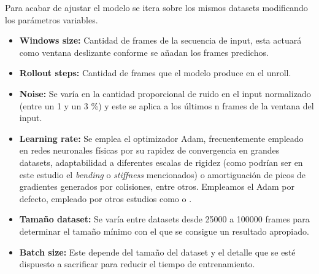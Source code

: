 Para acabar de ajustar el modelo se itera sobre los mismos datasets modificando los parámetros variables.
\begin{itemize}
    \item \textbf{Windows size:} Cantidad de frames de la secuencia de input, esta actuará como ventana deslizante conforme se añadan los frames predichos.
    \item \textbf{Rollout steps:} Cantidad de frames que el modelo produce en el unroll.
    \item \textbf{Noise:} Se varía en la cantidad proporcional de ruido en el input normalizado (entre un 1 y un 3 \%) y este se aplica a los últimos n frames de la ventana del input.
    \item \textbf{Learning rate:} Se emplea el optimizador Adam, frecuentemente empleado en redes neuronales físicas por su rapidez de convergencia en grandes datasets, adaptabilidad a diferentes escalas de rigidez (como podrían ser en este estudio el \textit{bending} o \textit{stiffness} mencionados) o  amortiguación de picos de gradientes generados por colisiones, entre otros. Empleamos el Adam por defecto, empleado por otros estudios como \cite{bertiche2021PBNS} o \cite{chentanez_cloth_2020}. 
    \item \textbf{Tamaño dataset:} Se varía entre datasets desde 25000 a 100000 frames para determinar el tamaño mínimo con el que se consigue un resultado apropiado.
    \item \textbf{Batch size:} Este depende del tamaño del dataset y el detalle que se esté dispuesto a sacrificar para reducir el tiempo de entrenamiento.
\end{itemize}